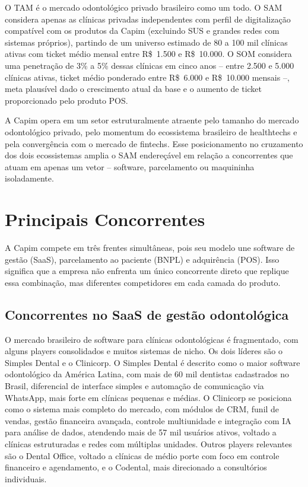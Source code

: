 O TAM é o mercado odontológico privado brasileiro como um todo. O SAM considera apenas as clínicas privadas independentes com perfil de digitalização compatível com os produtos da Capim (excluindo SUS e grandes redes com sistemas próprios), partindo de um universo estimado de 80 a 100 mil clínicas ativas com ticket médio mensal entre R\$~1.500 e R\$~10.000. O SOM considera uma penetração de 3\% a 5\% dessas clínicas em cinco anos -- entre 2.500 e 5.000 clínicas ativas, ticket médio ponderado entre R\$~6.000 e R\$~10.000 mensais --, meta plausível dado o crescimento atual da base e o aumento de ticket proporcionado pelo produto POS.

A Capim opera em um setor estruturalmente atraente pelo tamanho do mercado odontológico privado, pelo momentum do ecossistema brasileiro de healthtechs e pela convergência com o mercado de fintechs. Esse posicionamento no cruzamento dos dois ecossistemas amplia o SAM endereçável em relação a concorrentes que atuam em apenas um vetor -- software, parcelamento ou maquininha isoladamente.

\section{Principais Concorrentes}

A Capim compete em três frentes simultâneas, pois seu modelo une software de gestão (SaaS), parcelamento ao paciente (BNPL) e adquirência (POS). Isso significa que a empresa não enfrenta um único concorrente direto que replique essa combinação, mas diferentes competidores em cada camada do produto.

\subsection{Concorrentes no SaaS de gestão odontológica}

O mercado brasileiro de software para clínicas odontológicas é fragmentado, com alguns players consolidados e muitos sistemas de nicho. Os dois líderes são o Simples Dental e o Clinicorp. O Simples Dental é descrito como o maior software odontológico da América Latina, com mais de 60 mil dentistas cadastrados no Brasil, diferencial de interface simples e automação de comunicação via WhatsApp, mais forte em clínicas pequenas e médias. O Clinicorp se posiciona como o sistema mais completo do mercado, com módulos de CRM, funil de vendas, gestão financeira avançada, controle multiunidade e integração com IA para análise de dados, atendendo mais de 57 mil usuários ativos, voltado a clínicas estruturadas e redes com múltiplas unidades. Outros players relevantes são o Dental Office, voltado a clínicas de médio porte com foco em controle financeiro e agendamento, e o Codental, mais direcionado a consultórios individuais.

